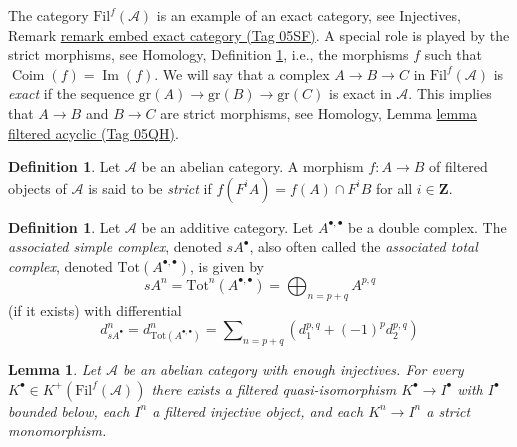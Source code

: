 \documentclass{amsart}
\theoremstyle{plain}
\newtheorem{lemma}[subsection]{Lemma}
\theoremstyle{definition}
\newtheorem{definition}[subsection]{Definition}
\theoremstyle{remark}
\numberwithin{equation}{subsection}
\def\Im{\mathop{\mathrm{Im}}}
\def\Coim{\mathop{\mathrm{Coim}}}
\begin{document}
\medskip\noindent
The category $\text{Fil}^f(\mathcal{A})$ is an example of an
exact category, see
Injectives, Remark \href{https://stacks.math.columbia.edu/tag/05SF}{remark embed exact category (Tag 05SF)}.
A special role is played by the strict morphisms, see
Homology, Definition \ref{homology-definition-strict},
i.e., the morphisms $f$ such that $\Coim(f) = \Im(f)$.
We will say that a complex $A \to B \to C$ in $\text{Fil}^f(\mathcal{A})$ is
{\it exact} if the sequence $\text{gr}(A) \to \text{gr}(B) \to \text{gr}(C)$
is exact in $\mathcal{A}$. This implies that $A \to B$ and $B \to C$
are strict morphisms, see
Homology, Lemma \href{https://stacks.math.columbia.edu/tag/05QH}{lemma filtered acyclic (Tag 05QH)}.



\begin{definition}
\label{homology-definition-strict}
Let $\mathcal{A}$ be an abelian category.
A morphism $f : A \to B$ of filtered objects of $\mathcal{A}$ is
said to be {\it strict} if $f(F^iA) = f(A) \cap F^iB$ for
all $i \in \mathbf{Z}$.
\end{definition}

\begin{definition}
\label{homology-definition-associated-simple-complex}
Let $\mathcal{A}$ be an additive category.
Let $A^{\bullet, \bullet}$ be a double complex.
The {\it associated simple complex}, denoted $sA^\bullet$, also
often called the {\it associated total complex}, denoted
$\text{Tot}(A^{\bullet, \bullet})$, is
given by
$$
sA^n = \text{Tot}^n(A^{\bullet, \bullet}) =
\bigoplus\nolimits_{n = p + q} A^{p, q}
$$
(if it exists) with differential
$$
d_{sA^\bullet}^n = d_{\text{Tot}(A^{\bullet, \bullet})}^n =
\sum\nolimits_{n = p + q} (d_1^{p, q} + (-1)^p d_2^{p, q})
$$
\end{definition}

\begin{lemma}
\label{lemma-right-resolution-by-filtered-injectives}
Let $\mathcal{A}$ be an abelian category with enough injectives.
For every $K^\bullet \in K^{+}(\text{Fil}^f(\mathcal{A}))$
there exists a filtered quasi-isomorphism $K^\bullet \to I^\bullet$
with $I^\bullet$ bounded below,
each $I^n$ a filtered injective object, and
each $K^n \to I^n$ a strict monomorphism.
\end{lemma}
\end{document}
